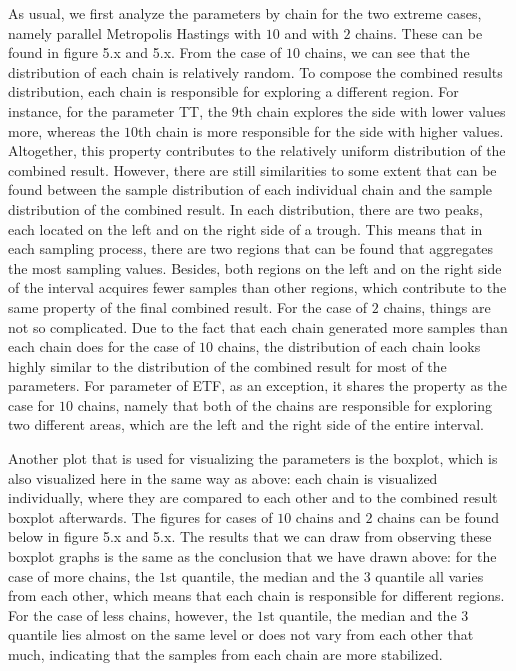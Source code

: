 As usual, we first analyze the parameters by chain for the two extreme cases, namely parallel Metropolis Hastings with $10$ and with $2$ chains. These can be found in figure 5.x and 5.x. From the case of $10$ chains, we can see that the distribution of each chain is relatively random. To compose the combined results distribution, each chain is responsible for exploring a different region. For instance, for the parameter TT, the $9$th chain explores the side with lower values more, whereas the $10$th chain is more responsible for the side with higher values. Altogether, this property contributes to the relatively uniform distribution of the combined result. However, there are still similarities to some extent that can be found between the sample distribution of each individual chain and the sample distribution of the combined result. In each distribution, there are two peaks, each located on the left and on the right side of a trough. This means that in each sampling process, there are two regions that can be found that aggregates the most sampling values. Besides, both regions on the left and on the right side of the interval acquires fewer samples than other regions, which contribute to the same property of the final combined result. For the case of $2$ chains, things are not so complicated. Due to the fact that each chain generated more samples than each chain does for the case of $10$ chains, the distribution of each chain looks highly similar to the distribution of the combined result for most of the parameters. For parameter of ETF, as an exception, it shares the property as the case for $10$ chains, namely that both of the chains are responsible for exploring two different areas, which are the left and the right side of the entire interval.

Another plot that is used for visualizing the parameters is the boxplot, which is also visualized here in the same way as above: each chain is visualized individually, where they are compared to each other and to the combined result boxplot afterwards. The figures for cases of $10$ chains and $2$ chains can be found below in figure 5.x and 5.x. The results that we can draw from observing these boxplot graphs is the same as the conclusion that we have drawn above: for the case of more chains, the $1$st quantile, the median and the $3$ quantile all varies from each other, which means that each chain is responsible for different regions. For the case of less chains, however, the $1$st quantile, the median and the $3$ quantile lies almost on the same level or does not vary from each other that much, indicating that the samples from each chain are more stabilized. 

